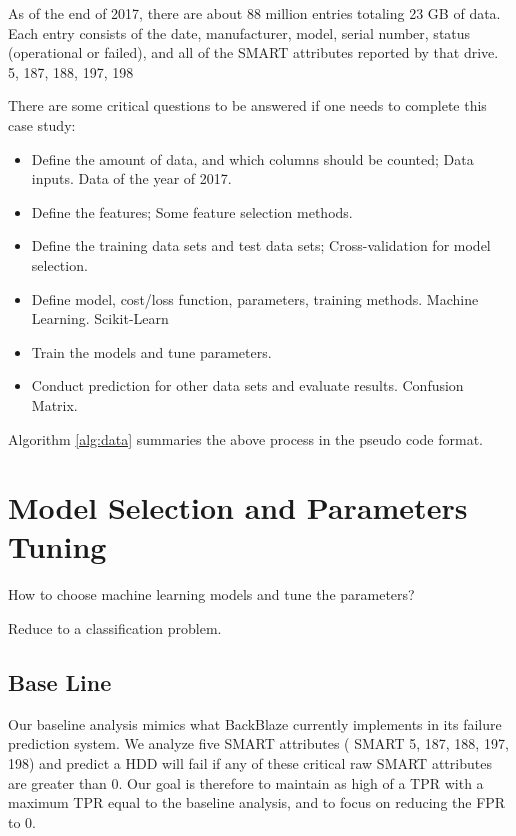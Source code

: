 \documentclass[12pt,a4paper,english]{amsart}
\begin{document}
As of the end of 2017, there are about 88 million entries totaling 23 GB of data. Each entry consists of the date, manufacturer, model, serial number, status (operational or failed), and all of the SMART attributes reported by that drive. 
5, 187, 188, 197, 198



There are some critical questions to be answered if one needs to complete this case study:

\begin{itemize}
	\item Define the amount of data, and which columns should be counted; Data inputs.
			Data of the year of 2017.
	\item Define the features; Some feature selection methods.
	\item Define the training data sets and test data sets; Cross-validation for model selection.
	\item Define model, cost/loss function, parameters, training methods. Machine Learning. Scikit-Learn
	\item Train the models and tune parameters.
	\item Conduct prediction for other data sets and evaluate results. Confusion Matrix.
\end{itemize}
Algorithm \ref{alg:data} summaries the above process in the pseudo code format.


%
\section{Model Selection and Parameters Tuning}

How to choose machine learning models and tune the parameters?

Reduce to a classification problem.


\subsection*{Base Line}

Our baseline analysis mimics what BackBlaze currently implements in its failure prediction system. We analyze five SMART attributes ( SMART 5, 187, 188, 197, 198) and predict a HDD will fail if any of these critical raw SMART attributes are greater than 0.
Our goal is therefore to maintain as high of a TPR with a maximum TPR equal to the baseline analysis, and to focus on reducing the FPR to 0.
\end{document}
